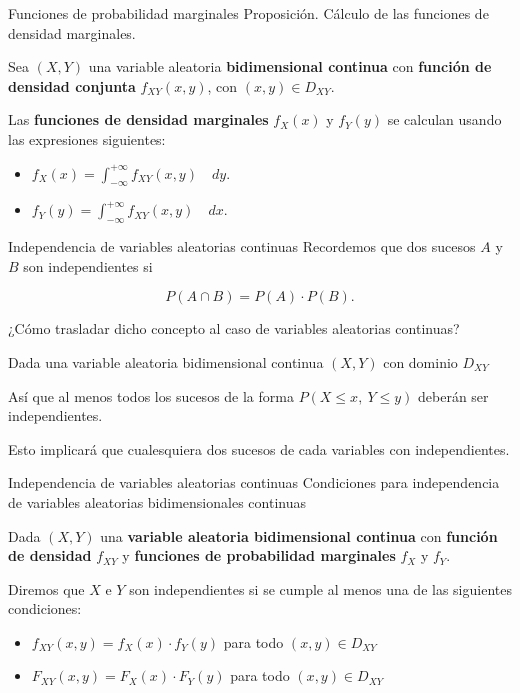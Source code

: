 \documentclass[
  ignorenonframetext,
]{beamer}
\begin{document}
\begin{frame}{Funciones de probabilidad marginales}
\protect\hypertarget{funciones-de-probabilidad-marginales}{}
Proposición. Cálculo de las funciones de densidad marginales.

Sea \((X,Y)\) una variable aleatoria \textbf{bidimensional continua} con
\textbf{función de densidad conjunta} \(f_{XY}(x,y)\), con
\((x,y)\in D_{XY}\).

Las \textbf{funciones de densidad marginales} \(f_X(x)\) y \(f_Y(y)\) se
calculan usando las expresiones siguientes:

\begin{itemize}
\item
  \(f_X(x)= \int_{-\infty}^{+\infty} f_{XY}(x,y)\quad dy.\)
\item
  \(f_Y(y)= \int_{-\infty}^{+\infty} f_{XY}(x,y)\quad dx.\)
\end{itemize}
\end{frame}

\begin{frame}{Independencia de variables aleatorias continuas}
\protect\hypertarget{independencia-de-variables-aleatorias-continuas}{}
Recordemos que dos sucesos \(A\) y \(B\) son independientes si

\[P(A\cap B)=P(A)\cdot P(B).\]

¿Cómo trasladar dicho concepto al caso de variables aleatorias
continuas?

Dada una variable aleatoria bidimensional continua \((X,Y)\) con dominio
\(D_{XY}\)

Así que al menos todos los sucesos de la forma
\(P\left(X\leq x ,\  Y\leq y\right)\) deberán ser independientes.

Esto implicará que cualesquiera dos sucesos de cada variables con
independientes.
\end{frame}

\begin{frame}{Independencia de variables aleatorias continuas}
\protect\hypertarget{independencia-de-variables-aleatorias-continuas-1}{}
Condiciones para independencia de variables aleatorias bidimensionales
continuas

Dada \((X,Y)\) una \textbf{variable aleatoria bidimensional continua}
con \textbf{función de densidad} \(f_{XY}\) y \textbf{funciones de
probabilidad marginales} \(f_X\) y \(f_Y\).

Diremos que \(X\) e \(Y\) son independientes si se cumple al menos una
de las siguientes condiciones:

\begin{itemize}
\item
  \(f_{XY}(x,y)=f_X(x)\cdot f_Y(y)\) para todo \((x,y)\in D_{XY}\)
\item
  \(F_{XY}(x,y)=F_X(x)\cdot F_Y(y)\) para todo \((x,y)\in D_{XY}\)
\end{itemize}
\end{frame}
\end{document}
